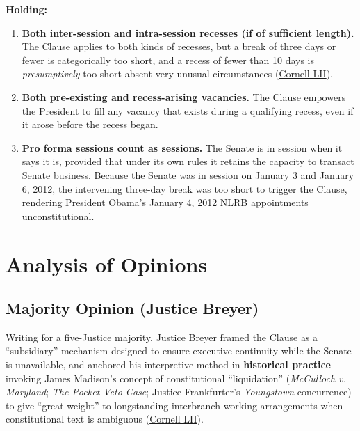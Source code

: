 \documentclass[12pt]{article}
\begin{document}
\textbf{Holding:}

\begin{enumerate}
  \item \textbf{Both inter-session and intra-session recesses (if of sufficient length).} The Clause applies to both kinds of recesses, but a break of three days or fewer is categorically too short, and a recess of fewer than 10 days is \emph{presumptively} too short absent very unusual circumstances (\href{https://www.law.cornell.edu/supremecourt/text/12-1281}{Cornell LII}).
  \item \textbf{Both pre-existing and recess-arising vacancies.} The Clause empowers the President to fill any vacancy that exists during a qualifying recess, even if it arose before the recess began.
  \item \textbf{Pro forma sessions count as sessions.} The Senate is in session when it says it is, provided that under its own rules it retains the capacity to transact Senate business. Because the Senate was in session on January 3 and January 6, 2012, the intervening three-day break was too short to trigger the Clause, rendering President Obama's January 4, 2012 NLRB appointments unconstitutional.
\end{enumerate}

\section{Analysis of Opinions}
\subsection{Majority Opinion (Justice Breyer)}

Writing for a five-Justice majority, Justice Breyer framed the Clause as a ``subsidiary'' mechanism designed to ensure executive continuity while the Senate is unavailable, and anchored his interpretive method in \textbf{historical practice}---invoking James Madison's concept of constitutional ``liquidation'' (\emph{McCulloch v. Maryland}; \emph{The Pocket Veto Case}; Justice Frankfurter's \emph{Youngstown} concurrence) to give ``great weight'' to longstanding interbranch working arrangements when constitutional text is ambiguous (\href{https://www.law.cornell.edu/supremecourt/text/12-1281}{Cornell LII}).
\end{document}
